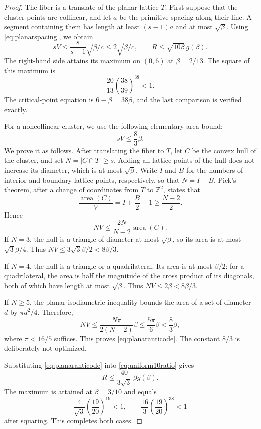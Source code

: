 \documentclass[11pt,a4paper]{article}
\theoremstyle{remark}\newtheorem{remark}[theorem]{Remark}
\newcommand{\Z}{\mathbb Z}\newcommand{\R}{\mathbb R}\newcommand{\F}{\mathbb F}
\begin{document}
\begin{proof}
The fiber is a translate of the planar lattice $T$. First suppose that the cluster points are collinear, and let $a$ be the primitive spacing along their line. A segment containing them has length at least $(s-1)a$ and at most $\sqrt\beta$. Using \eqref{eq:planarspacing}, we obtain
\[
sV\le\frac{s}{s-1}\sqrt{\beta/c}\le2\sqrt{\beta/c},
\qquad
R\le\sqrt{10\beta}\,g(\beta).
\]
The right-hand side attains its maximum on $(0,6)$ at $\beta=2/13$. The square of this maximum is
\[
\frac{20}{13}\left(\frac{38}{39}\right)^{38}<1.
\]
The critical-point equation is $6-\beta=38\beta$, and the last comparison is verified exactly.

For a noncollinear cluster, we use the following elementary area bound:
\begin{equation}\label{eq:planaranticode}
sV\le\frac83\beta.
\end{equation}
We prove it as follows. After translating the fiber to $T$, let $C$ be the convex hull of the cluster, and set $N=|C\cap T|\ge s$. Adding all lattice points of the hull does not increase its diameter, which is at most $\sqrt\beta$. Write $I$ and $B$ for the numbers of interior and boundary lattice points, respectively, so that $N=I+B$. Pick's theorem, after a change of coordinates from $T$ to $\Z^2$, states that
\[
\frac{\operatorname{area}(C)}V=I+\frac B2-1
\ge\frac{N-2}{2}.
\]
Hence
\[
NV\le\frac{2N}{N-2}\operatorname{area}(C).
\]
If $N=3$, the hull is a triangle of diameter at most $\sqrt\beta$, so its area is at most $\sqrt3\beta/4$. Thus $NV\le3\sqrt3\beta/2<8\beta/3$.

If $N=4$, the hull is a triangle or a quadrilateral. Its area is at most $\beta/2$: for a quadrilateral, the area is half the magnitude of the cross product of its diagonals, both of which have length at most $\sqrt\beta$. Thus $NV\le2\beta<8\beta/3$.

If $N\ge5$, the planar isodiametric inequality bounds the area of a set of diameter $d$ by $\pi d^2/4$. Therefore,
\[
NV\le\frac{N\pi}{2(N-2)}\beta
\le\frac{5\pi}{6}\beta<\frac83\beta,
\]
where $\pi<16/5$ suffices. This proves \eqref{eq:planaranticode}. The constant $8/3$ is deliberately not optimized.

Substituting \eqref{eq:planaranticode} into \eqref{eq:uniform10ratio} gives
\[
R\le\frac{40}{3\sqrt3}\,\beta g(\beta).
\]
The maximum is attained at $\beta=3/10$ and equals
\[
\frac4{\sqrt3}\left(\frac{19}{20}\right)^{19}<1,
\qquad
\frac{16}{3}\left(\frac{19}{20}\right)^{38}<1
\]
after squaring. This completes both cases.
\end{proof}
\end{document}
